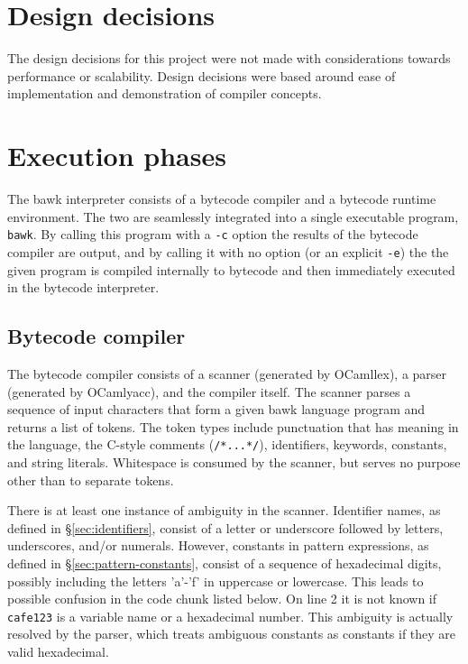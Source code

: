 \section{Design decisions}
The design decisions for this project were not made with considerations towards performance or scalability.  Design decisions were based around ease of implementation and demonstration of compiler concepts.

\section{Execution phases}
The bawk interpreter consists of a bytecode compiler and a bytecode runtime environment.  The two are seamlessly integrated into a single executable program, \texttt{bawk}.  By calling this program with a \texttt{-c} option the results of the bytecode compiler are output, and by calling it with no option (or an explicit \texttt{-e}) the the given program is compiled internally to bytecode and then immediately executed in the bytecode interpreter.

\subsection{Bytecode compiler}
\label{sec:bytecode-compiler}
The bytecode compiler consists of a scanner (generated by OCamllex), a parser (generated by OCamlyacc), and the compiler itself.  The scanner parses a sequence of input characters that form a given bawk language program and returns a list of tokens.  The token types include punctuation that has meaning in the language, the C-style comments (\texttt{/*...*/}), identifiers, keywords, constants, and string literals.  Whitespace is consumed by the scanner, but serves no purpose other than to separate tokens.

There is at least one instance of ambiguity in the scanner.  Identifier names, as defined in \S\ref{sec:identifiers}, consist of a letter or underscore followed by letters, underscores, and/or numerals.  However, constants in pattern expressions, as defined in \S\ref{sec:pattern-constants}, consist of a sequence of hexadecimal digits, possibly including the letters 'a'-'f' in uppercase or lowercase.  This leads to possible confusion in the code chunk listed below.  On line 2 it is not known if \texttt{cafe123} is a variable name or a hexadecimal number.  This ambiguity is actually resolved by the parser, which treats ambiguous constants as constants if they are valid hexadecimal.

